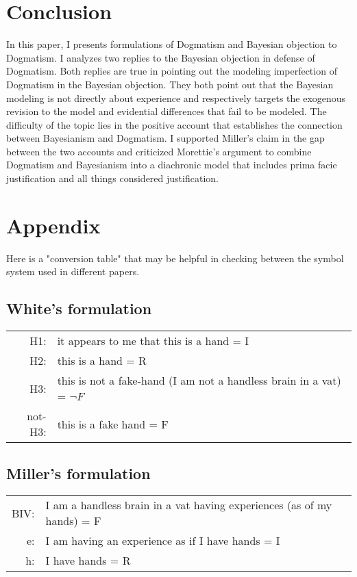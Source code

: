 \section{Conclusion}

In this paper, I presents formulations of Dogmatism and Bayesian
objection to Dogmatism. I analyzes two replies to the Bayesian objection
in defense of Dogmatism. Both replies are true in pointing out the
modeling imperfection of Dogmatism in the Bayesian objection. They both
point out that the Bayesian modeling is not directly about experience
and respectively targets the exogenous revision to the model and
evidential differences that fail to be modeled. The difficulty of the
topic lies in the positive account that establishes the connection
between Bayesianism and Dogmatism. I supported Miller's claim in the gap
between the two accounts and criticized Morettie's argument to combine
Dogmatism and Bayesianism into a diachronic model that includes prima
facie justification and all things considered justification.
\clearpage
\section*{Appendix}

Here is a "conversion table" that may be helpful in checking between the
symbol system used in different papers.

\subsection*{\normalsize White's formulation} 

\begin{tabular}{rp{8cm}}
	H1: 	& it appears to me that this is a hand = I\\

	H2: 	& this is a hand = R\\

	H3: 	& this is not a fake-hand (I am not a handless brain in a vat) =
$\neg F$\\

	not-H3:	& this is a fake hand = F
\end{tabular}

\subsection*{\normalsize Miller's formulation}

\begin{tabular}{rp{8cm}}
	BIV: 	& I am a handless brain in a vat having experiences (as of my hands) = F\\

	e: 	& I am having an experience as if I have hands = I\\

	h: 	& I have hands = R
\end{tabular}


